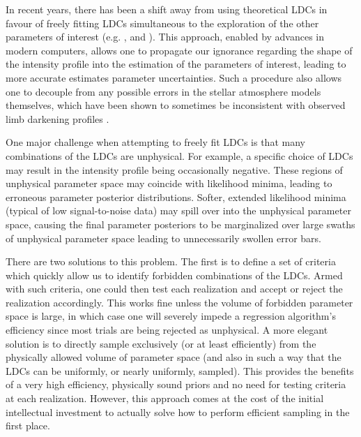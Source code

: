 In recent years, there has been a shift away from using theoretical LDCs in 
favour of freely fitting LDCs simultaneous to the exploration of the other 
parameters of interest (e.g. \citealt{knutson:2007}, \citealt{kipbak:2011a,
kipbak:2011b} and \citealt{kreidberg:2014}). This approach, enabled by advances 
in modern computers, allows one to propagate our ignorance regarding the shape 
of the intensity profile into the estimation of the parameters of interest, 
leading to more accurate estimates parameter uncertainties. Such a procedure
also allows one to decouple from any possible errors in the stellar atmosphere
models themselves, which have been shown to sometimes be inconsistent with
observed limb darkening profiles \citep{howarth:2011,epinoza:2015}.


One major challenge when attempting to freely fit LDCs is that many combinations
of the LDCs are unphysical. For example, a specific choice of LDCs may result
in the intensity profile being occasionally negative. These regions of 
unphysical parameter space may coincide with likelihood minima, leading to
erroneous parameter posterior distributions. Softer, extended likelihood
minima (typical of low signal-to-noise data) may spill over into the unphysical
parameter space, causing the final parameter posteriors to be marginalized over 
large swaths of unphysical parameter space leading to unnecessarily swollen 
error bars.

There are two solutions to this problem. The first is to define a set of 
criteria which quickly allow us to identify forbidden combinations of the LDCs.
Armed with such criteria, one could then test each realization and accept or
reject the realization accordingly. This works fine unless the volume of
forbidden parameter space is large, in which case one will severely impede
a regression algorithm's efficiency since most trials are being rejected
as unphysical. A more elegant solution is to directly sample exclusively (or
at least efficiently) from the physically allowed volume of parameter space (and 
also in such a way that the LDCs can be uniformly, or nearly uniformly, 
sampled). This provides the benefits of a very high efficiency, physically sound 
priors and no need for testing criteria at each realization. However, this 
approach comes at the cost of the initial intellectual investment to actually 
solve how to perform efficient sampling in the first place.

